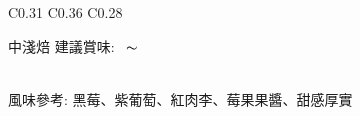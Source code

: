 \documentclass[10pt,a4paper]{article}
\begin{document}
\begin{tabular}{C{0.31\textwidth} C{0.36\textwidth} C{0.28\textwidth}}
{ \addtocounter{datenumber}{
5 }%
\setdatebynumber{\thedatenumber} 
{\normalsize 
中淺焙%
\enskip \scriptsize 建議賞味:} \scriptsize{\datemonthname ~\thedateday}$\thicksim$\addtocounter{datenumber}{55}\setdatebynumber{\thedatenumber} \datedate
\\\scriptsize 風味參考: 黑莓、紫葡萄、紅肉李、莓果果醬、甜感厚實
}\vspace*{-0.1em}\tabularnewline
\shortstack[c]{
%
%
}
\end{tabular}
\end{document}

